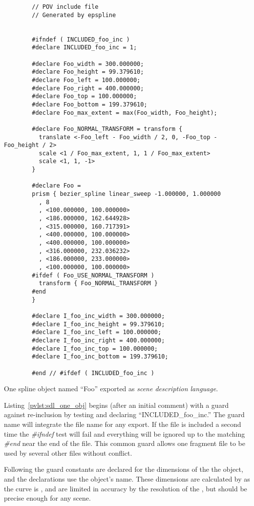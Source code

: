 	\begin{povsdl}
		{\small
		\begin{verbatim}
		// POV include file
		// Generated by epspline
		
		
		#ifndef ( INCLUDED_foo_inc )
		#declare INCLUDED_foo_inc = 1;
		
		#declare Foo_width = 300.000000;
		#declare Foo_height = 99.379610;
		#declare Foo_left = 100.000000;
		#declare Foo_right = 400.000000;
		#declare Foo_top = 100.000000;
		#declare Foo_bottom = 199.379610;
		#declare Foo_max_extent = max(Foo_width, Foo_height);
		
		#declare Foo_NORMAL_TRANSFORM = transform {
		  translate <-Foo_left - Foo_width / 2, 0, -Foo_top - Foo_height / 2>
		  scale <1 / Foo_max_extent, 1, 1 / Foo_max_extent>
		  scale <1, 1, -1>
		}
		
		#declare Foo =
		prism { bezier_spline linear_sweep -1.000000, 1.000000
		  , 8
		  , <100.000000, 100.000000>
		  , <186.000000, 162.644928>
		  , <315.000000, 160.717391>
		  , <400.000000, 100.000000>
		  , <400.000000, 100.000000>
		  , <316.000000, 232.036232>
		  , <186.000000, 233.000000>
		  , <100.000000, 100.000000>
		#ifdef ( Foo_USE_NORMAL_TRANSFORM )
		  transform { Foo_NORMAL_TRANSFORM }
		#end
		}
		
		#declare I_foo_inc_width = 300.000000;
		#declare I_foo_inc_height = 99.379610;
		#declare I_foo_inc_left = 100.000000;
		#declare I_foo_inc_right = 400.000000;
		#declare I_foo_inc_top = 100.000000;
		#declare I_foo_inc_bottom = 199.379610;
		
		#end // #ifdef ( INCLUDED_foo_inc )
		\end{verbatim}
		}%
	\caption{One spline object named ``Foo'' exported as
		\emph{scene description language}.}
	\label{pvlst:sdl_one_obj}
	\end{povsdl}

	Listing~\ref{pvlst:sdl_one_obj} begins (after an initial
	comment) with a guard against re-inclusion by testing and
	declaring ``INCLUDED\_foo\_inc.'' The guard name will
	integrate the file name for any export. If the file is
	included a second time the \emph{\#ifndef} test will fail
	and everything will be ignored up to the matching
	\emph{\#end} near the end of the file. This common guard
	allows one fragment file to be used by several other files
	without conflict.
	
	Following the guard constants are declared for the
	dimensions of the the object, and the declarations use
	the object's name. These dimensions are calculated
	by \IXpkg{} as the curve is ,
	and are limited in accuracy by the resolution of the
	, but should be precise enough
	for any scene.
	
